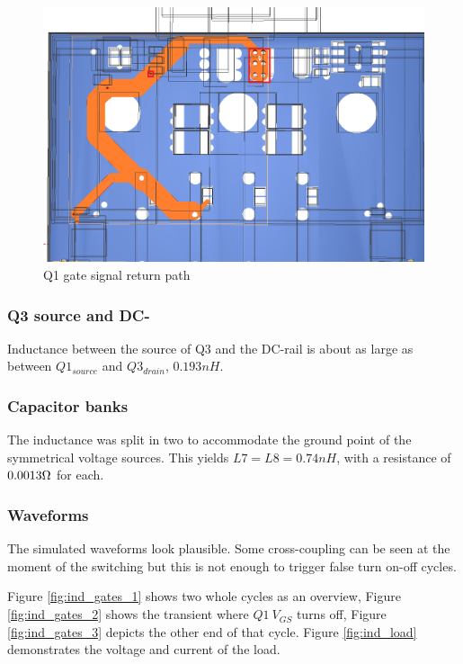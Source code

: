 \begin{figure}[H]
	\centering
	\includegraphics[width=\textwidth]{pictures/implementation/ind/q1_r5.png}
	\caption{Q1 gate signal return path}
	\label{fig:q1_r5}
\end{figure}

\subsubsection{Q3 source and DC-}
\label{sec:q3_source}

Inductance between the source of Q3 and the DC-rail is about as large as between $Q1_{source}$ and $Q3_{drain}$, $0.193 nH$.

\subsubsection{Capacitor banks}
\label{sec:cap_banks}

The inductance was split in two to accommodate the ground point of the symmetrical voltage sources. This yields $L7 = L8  = 0.74 nH$, with a resistance of $0.0013 \ohm$ for each.

\subsubsection{Waveforms}
\label{sec:ind_waveforms}

The simulated waveforms look plausible. Some cross-coupling can be seen at the moment of the switching but this is not enough to trigger false turn on-off cycles.

Figure \ref{fig:ind_gates_1} shows two whole cycles as an overview, Figure \ref{fig:ind_gates_2} shows the transient where $ Q1\ V_{GS}$ turns off, Figure \ref{fig:ind_gates_3} depicts the other end of that cycle. Figure \ref{fig:ind_load} demonstrates the voltage and current of the load.

